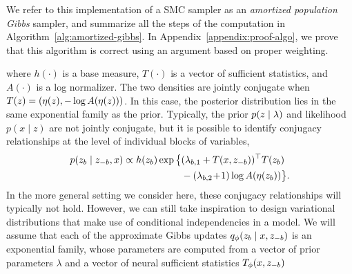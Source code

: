 \documentclass{article}
\theoremstyle{definition}
\begin{document}
We refer to this implementation of a SMC sampler as an \emph{amortized population Gibbs} sampler, and summarize all the steps of the computation in Algorithm~\ref{alg:amortized-gibbs}. In Appendix~\ref{appendix:proof-algo}, we prove that this algorithm is correct using an argument based on proper weighting. 






where $h(\cdot)$ is a base measure, $T(\cdot)$ is a vector of sufficient statistics, and $A(\cdot)$ is a log normalizer. The two densities are jointly conjugate when $T(z) = (\eta(z), -\log A(\eta(z)))$.
In this case, the posterior distribution lies in the same exponential family as the prior.
Typically, the prior $p(z \mid \lambda)$ and likelihood $p(x \mid z)$ are not jointly conjugate, but it is possible to identify conjugacy relationships at the level of individual blocks of variables, 
\begin{align*}
    p(z_b \mid z_{-b}, x)
    \propto
    h(z_b) 
    \exp \big\{ 
        &
        (\lambda_{b,1} + T(x, z_{-b}))^\top T(z_b) 
        \\
        &
        -
        (\lambda_{b,2} \!+\! 1) 
        \log A(\eta(z_b))
    \big\}
    .
\end{align*}
In the more general setting we consider here, these conjugacy relationships will typically not hold. However, we can still take inspiration to design variational distributions that make use of conditional independencies in a model. We will assume that each of the approximate Gibbs updates $q_\phi(z_b \mid x, z_{-b})$ is an exponential family, whose parameters are computed from a vector of prior parameters $\lambda$ and a vector of neural sufficient statistics $T_\phi(x, z_{-b})$
\end{document}
